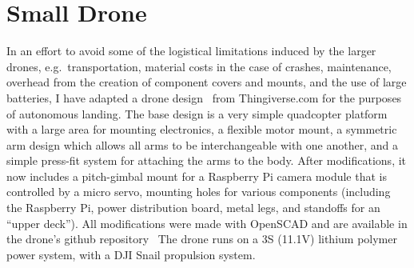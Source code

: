 \section{Small Drone}
\label{section:small_drone}

In an effort to avoid some of the logistical limitations induced by the larger drones,
e.g.~transportation, material costs in the case of crashes, maintenance, overhead from the creation of
component covers and mounts, and the use of large batteries,
I have adapted a drone design~\cite{raspberry_pi_drone_thingiverse_original} from Thingiverse.com for the purposes of autonomous landing.
The base design is a very simple quadcopter platform with
a large area for mounting electronics,
a flexible motor mount,
a symmetric arm design which allows all arms to be interchangeable with one another,
and
a simple press-fit system for attaching the arms to the body.
After modifications, it now includes a pitch-gimbal mount for a Raspberry Pi camera module that is controlled by a micro servo,
mounting holes for various components (including the Raspberry Pi, power distribution board, metal legs, and standoffs for an ``upper deck'').
All modifications were made with OpenSCAD and are available in the drone's github repository~\cite{rpi_drone_github_repo}
The drone runs on a 3S (11.1V) lithium polymer power system, with a DJI Snail propulsion system.

